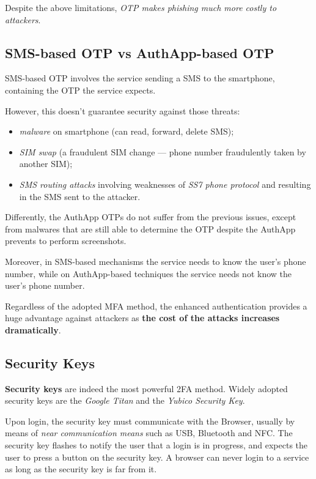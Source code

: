 \documentclass[10pt]{extreport}
\begin{document}
Despite the above limitations, \emph{OTP makes phishing much more costly to
attackers}.

\subsection{SMS\--based OTP vs AuthApp\--based OTP}

SMS\--based OTP involves the service sending a SMS to the smartphone,
containing the OTP the service expects.

However, this doesn't guarantee security against those threats:
\begin{itemize}
    \item \emph{malware} on smartphone (can read, forward, delete SMS);
    \item \emph{SIM swap} (a fraudulent SIM change --- phone number fraudulently
        taken by another SIM);
    \item \emph{SMS routing attacks} involving weaknesses of \emph{SS7 phone
        protocol} and resulting in the SMS sent to the attacker.
\end{itemize}

Differently, the AuthApp OTPs do not suffer from the previous issues, except
from malwares that are still able to determine the OTP despite the AuthApp
prevents to perform screenshots.

Moreover, in SMS\--based mechanisms the service needs to know the user's phone
number, while on AuthApp\--based techniques the service needs not know the
user's phone number.

Regardless of the adopted MFA method, the enhanced authentication provides a
huge advantage against attackers as \textbf{the cost of the attacks increases
dramatically}.

\subsection{Security Keys}

\textbf{Security keys} are indeed the most powerful 2FA method. Widely adopted
security keys are the \emph{Google Titan} and the \emph{Yubico Security Key}.

Upon login, the security key must communicate with the Browser, usually by
means of \emph{near communication means} such as USB, Bluetooth and NFC. The
security key flashes to notify the user that a login is in progress, and
expects the user to press a button on the security key. A browser can never
login to a service as long as the security key is far from it.
\end{document}
